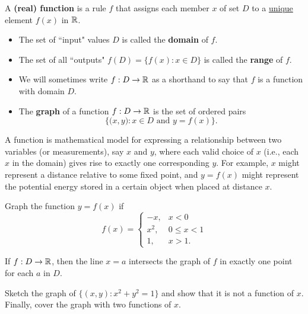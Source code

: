 \newpage

\begin{definition}
A \textbf{(real) function} is a rule $f$ that assigns each member $x$ of set $D$ to a \underline{unique} element $f(x)$ in $\mathbb R$.
\begin{itemize}
\item The set of ``input" values $D$ is called the \textbf{domain} of $f$.
\item The set of all ``outputs" $f(D) = \{f(x) : x\in D\}$ is called the \textbf{range} of $f$.
\item We will sometimes write $f:D\to \mathbb R$ as a shorthand to say that $f$ is a function with domain $D$.
\item The \textbf{graph} of a function $f:D\to \mathbb R$ is the set of ordered pairs
\begin{equation*}
\Big\{\big(x,y\big) : x\in D\text{ and }y=f(x)\Big\}.
\end{equation*}
\end{itemize}
\end{definition}

\begin{remark}
A function is mathematical model for expressing a relationship between two variables (or measurements), say $x$ and $y$, 
where each valid choice of $x$ (i.e., each $x$ in the domain) gives rise to exactly one corresponding $y$.
For example, $x$ might represent a distance relative to some fixed point,
and $y = f(x)$ might represent the potential energy stored in a certain object when placed at distance $x$.
\end{remark}

\begin{example}
Graph the function $y=f(x)$ if
\begin{equation*}
f(x)=\begin{cases}
-x, & x<0\\
x^2,& 0\le x< 1\\
1, & x>1.
\end{cases}
\end{equation*}
\end{example}

\newpage

\begin{theorem}
If $f:D\to \mathbb R$, then the line $x=a$ intersects the graph of $f$ in exactly one point for each $a$ in $D$.
\end{theorem}

\begin{example}
Sketch the graph of $\big\{(x,y) : x^2+y^2=1\big\}$ and show that it is not a function of $x$.
Finally, cover the graph with two functions of $x$.
\end{example}


